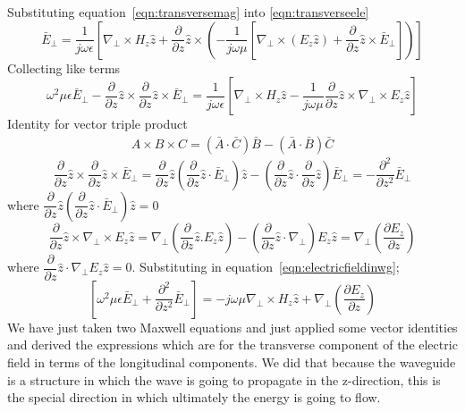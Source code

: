 Substituting equation~\ref{eqn:transversemag} into \ref{eqn:transverseele}
\begin{dmath*}
\bar{E}_\bot = \frac{1}{j\omega\epsilon} \left[\nabla_\bot\times H_z\hat{z} + \frac{\partial}{\partial z}\hat{z}\times \left( -\frac{1}{j\omega\mu} \left[\nabla_\bot\times(E_z\hat{z}) + \frac{\partial}{\partial z}\hat{z}\times\bar{E}_\bot\right] \right)\right] 
\end{dmath*}
Collecting like terms
\begin{dmath}
\omega^2\mu\epsilon\bar{E}_\bot-\frac{\partial}{\partial z}\hat{z}\times\frac{\partial}{\partial z}\hat{z}\times\bar{E}_\bot = \frac{1}{j\omega\epsilon} \left[\nabla_\bot\times H_z\hat{z} - \frac{1}{j\omega\mu}\frac{\partial}{\partial z}\hat{z}\times\nabla_\bot\times E_z \hat{z} \right]
\label{eqn:electricfieldinwg}
\end{dmath}
Identity for vector triple product
\begin{align*}
A\times B\times C = (\bar{A}\cdot\bar{C})\bar{B} - (\bar{A}\cdot\bar{B})\bar{C}
\end{align*}
\begin{dmath*}
\frac{\partial}{\partial z}\hat{z}\times\frac{\partial}{\partial z}\hat{z}\times\bar{E}_\bot = \frac{\partial}{\partial z}\hat{z}\left(\frac{\partial}{\partial z}\hat{z}\cdot\bar{E}_\bot\right)\hat{z} - \left(\frac{\partial}{\partial z}\hat{z}\cdot\frac{\partial}{\partial z}\hat{z}\right)\bar{E}_\bot = -\frac{\partial^2}{\partial z^2}\bar{E}_\bot
\end{dmath*}
where $\dfrac{\partial}{\partial z}\hat{z}\left(\dfrac{\partial}{\partial z}\hat{z}\cdot\bar{E}_\bot\right)\hat{z} = 0$
\begin{dmath*}
\frac{\partial}{\partial z}\hat{z}\times\nabla_\bot\times E_z\hat{z} = \nabla_\bot\left(\frac{\partial}{\partial z}\hat{z}.E_z\hat{z}\right) - \left(\frac{\partial}{\partial z}\hat{z}\cdot\nabla_\bot\right)E_z\hat{z} = \nabla_\bot\left(\frac{\partial E_z}{\partial z}\right)
\end{dmath*}
where $\dfrac{\partial}{\partial z}\hat{z}\cdot\nabla_\bot E_z\hat{z} = 0$. Substituting in equation~\ref{eqn:electricfieldinwg};
\begin{dmath}
\left[\omega^2\mu\epsilon\bar{E}_\bot+\frac{\partial^2}{\partial z^2}\bar{E}_\bot\right] = -j\omega\mu\nabla_\bot\times H_z\hat{z} + \nabla_\bot\left(\frac{\partial E_z}{\partial z}\right)
\end{dmath}
We have just taken two Maxwell equations and just applied some vector identities and derived the expressions which are for the transverse component of the electric field in terms of the longitudinal components. We did that because the waveguide is a structure in which the wave is going to propagate in the z-direction, this is the special direction in which ultimately the energy is going to flow.

